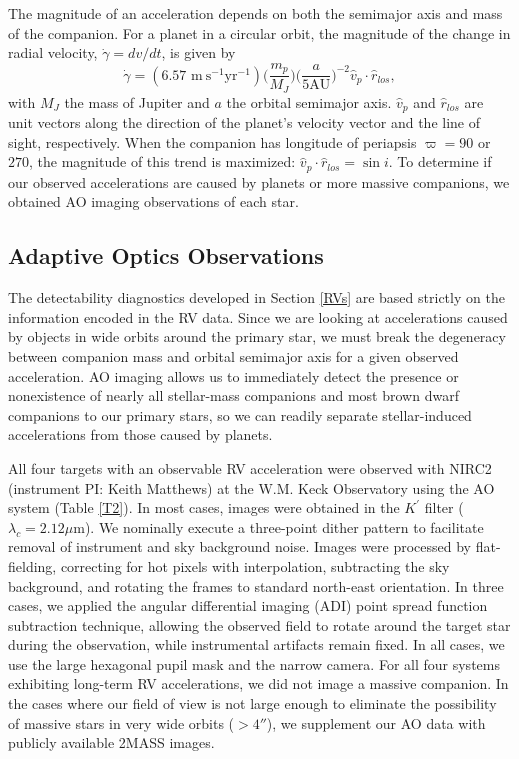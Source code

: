 The magnitude of an acceleration depends on both the semimajor axis and mass of the companion. For a planet in a circular orbit, the magnitude of the change in radial velocity, $\dot{\gamma} = dv/dt$, is given by
\begin{equation}
\dot{\gamma} = (6.57 \mbox{ m} \: \mbox{s}^{-1} \mbox{yr}^{-1})\bigg(\frac{m_p}{M_J}\bigg)\bigg(\frac{a}{5 \mbox{AU}}\bigg)^{-2} \hat{v}_p \cdot \hat{r}_{los},
\label{TrendSize}
\end{equation}
with $M_J$ the mass of Jupiter and $a$ the orbital semimajor axis. $\hat{v}_p$ and $\hat{r}_{los}$ are unit vectors along the direction of the planet's velocity vector and the line of sight, respectively. When the companion has longitude of periapsis $\varpi = 90$ or $270$, the magnitude of this trend is maximized: $\hat{v}_p \cdot \hat{r}_{los} = \sin i$. To determine if our observed accelerations are caused by planets or more massive companions, we obtained AO imaging observations of each star.




\subsection{Adaptive Optics Observations}
\label{AO Description}
The detectability diagnostics developed in Section \ref{RVs} are based strictly on the information encoded in the RV data. Since we are looking at accelerations caused by objects in wide orbits around the primary star, we must break the degeneracy between companion mass and orbital semimajor axis for a given observed acceleration. AO imaging allows us to immediately detect the presence or nonexistence of nearly all stellar-mass companions and most brown dwarf companions to our primary stars, so we can readily separate stellar-induced accelerations from those caused by planets. 

All four targets with an observable RV acceleration were observed with NIRC2 (instrument PI: Keith Matthews) at the W.M. Keck Observatory using the AO system \citep{Wizinowich00} (Table \ref{T2}). In most cases, images were obtained in the $K^\prime$ filter ($\lambda_c = 2.12 \mu$m). We nominally execute a three-point dither pattern to facilitate removal of instrument and sky background noise. Images were processed by flat-fielding, correcting for hot pixels with interpolation, subtracting the sky background, and rotating the frames to standard north-east orientation. In three cases, we applied the angular differential imaging (ADI) point spread function subtraction technique, allowing the observed field to rotate around the target star during the observation, while instrumental artifacts remain fixed. In all cases, we use the large hexagonal pupil mask and the narrow camera. For all four systems exhibiting long-term RV accelerations, we did not image a massive companion. In the cases where our field of view is not large enough to eliminate the possibility of massive stars in very wide orbits ($ > 4''$), we supplement our AO data with publicly available 2MASS images. 
 

